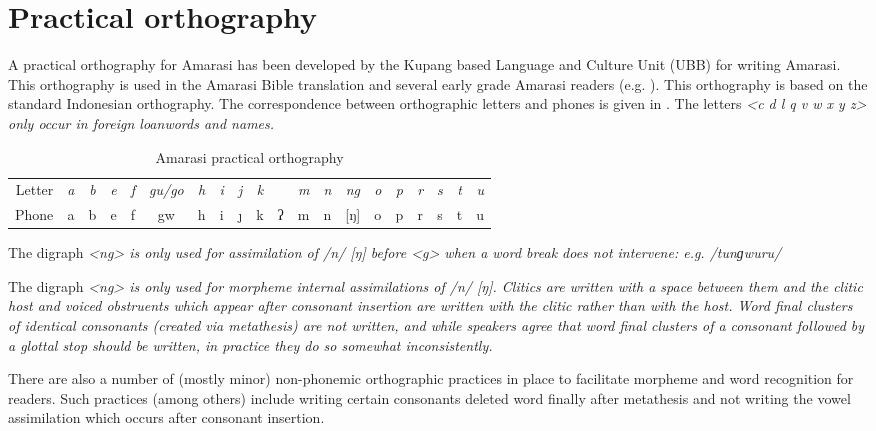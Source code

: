 \section{Practical orthography}\label{sec:Ort}
A practical orthography for Amarasi has been developed
by the Kupang based Language and Culture Unit (UBB) for writing Amarasi.
This orthography is used in the Amarasi Bible translation \cite{UBB15}
and several early grade Amarasi readers (e.g. \citealp{or16,or16b,or16c}).
This orthography is based on the standard Indonesian orthography.
The correspondence between orthographic letters and phones is given in .
The letters \it{<c d l q v w x y z>} only occur in foreign loanwords and names.

\begin{table}[h]
	\centering\caption{Amarasi practical orthography}\label{tab:AmaOrt}
		\stl{0.45em}\begin{tabular}{r|ccccccccccccccccccc}\lsptoprule
		Letter	&\it{a}	&\it{b}	&\it{e}	&\it{f}	&\it{gu/go}	&\it{h}	&\it{i}	&\it{j}	&\it{k}	&\it{\Q}&\it{m}	&\it{n}	&\it{ng}&\it{o}	&\it{p}	&\it{r}	&\it{s}	&\it{t}	&\it{u}\\
		Phone		&a			&b			&e			&f			&gw					&h			&i			&\j			&k			&ʔ			&m			&n			&[ŋ]		&o			&p			&r			&s			&t			&u \\
	\end{tabular}
\end{table}

The digraph \it{<ng>} is only used for assimilation
of /n/ {\ra} [ŋ] before \it{<g>} when a word break does not intervene:
e.g. /tunɡwuru/ {\ra} 

The digraph \it{<ng>} is only used for morpheme internal assimilations of /n/ {\ra} [ŋ].
Clitics are written with a space between them and the clitic host and
voiced obstruents which appear after consonant insertion
are written with the clitic rather than with the host.
Word final clusters of identical consonants (created via metathesis) are not written,
and while speakers agree that word final clusters of a
consonant followed by a glottal stop should be written,
in practice they do so somewhat inconsistently.

There are also a number of (mostly minor) non-phonemic
orthographic practices in place to facilitate
morpheme and word recognition for readers.
Such practices (among others) include writing certain consonants
deleted word finally after metathesis and not writing
the vowel assimilation which occurs after consonant insertion.

